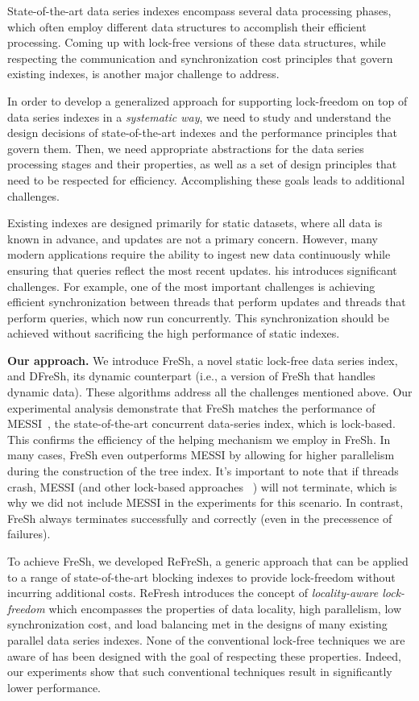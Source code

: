 State-of-the-art data series indexes encompass several data processing phases, 
which often employ different data structures to accomplish their efficient processing. 
Coming up with lock-free versions of these data structures, while respecting
the communication and synchronization cost principles that govern existing 
indexes, is another major challenge to address.

In order to develop a generalized approach for supporting lock-freedom 
on top of data series indexes in a {\em systematic way}, we need to study
and understand the design decisions of state-of-the-art indexes and the performance
principles that govern them. Then, we need appropriate abstractions for the data series
processing stages and their properties, as well as a set of design principles that need
to be respected for efficiency. Accomplishing these goals leads to additional challenges. 

Existing indexes are designed primarily for static datasets, where all data is known in advance,
and updates are not a primary concern. However, many modern applications require the ability to
ingest new data continuously while ensuring that queries reflect the most recent updates.
his introduces significant challenges. For example, one of the most important challenges is
achieving efficient synchronization between threads that perform updates and threads that perform
queries, which now run concurrently. This synchronization should be achieved without sacrificing
the high performance of static indexes.


\noindent
{\bf Our approach.}
We introduce FreSh, a novel static lock-free data series index, and DFreSh, its dynamic
counterpart (i.e., a version of FreSh that handles dynamic data). These algorithms address
all the challenges mentioned above.
Our experimental analysis demonstrate that FreSh matches the performance of 
MESSI~\cite{PFP21-I}, the state-of-the-art concurrent data-series index, which is lock-based. 
This confirms the efficiency of the helping mechanism we employ in FreSh. In many cases, 
FreSh even outperforms MESSI by allowing for higher parallelism during the construction of the
tree index.
It's important to note that if threads crash, MESSI (and other lock-based approaches
~\cite{peng2018paris,PFP21-I,PFP21-II,hercules}) will not terminate, which is 
why we did not include MESSI in the experiments for this scenario. In contrast, 
FreSh always terminates successfully and correctly (even in the precessence of failures).

To achieve FreSh, we developed ReFreSh, a generic approach that can be applied to a
range of state-of-the-art blocking indexes to provide lock-freedom without 
incurring additional costs. 
%
ReFresh introduces the concept of {\em locality-aware lock-freedom} which encompasses
the properties of data locality, high parallelism, low synchronization cost,
and load balancing met in the designs of many existing parallel data series indexes.
None of the conventional lock-free techniques we are aware of has been designed with
the goal of respecting these properties. Indeed, our experiments show that such
conventional techniques result in significantly lower performance.

